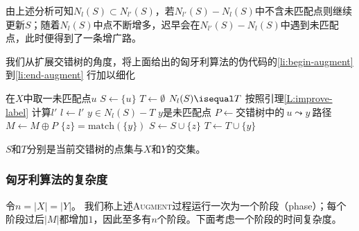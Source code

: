 \documentclass[a4paper]{ctexbook}
\newcommand{\match}{\mathrm{match}}
\begin{document}
  由上述分析可知$N_l(S)\subset N_{l'}(S)$，若$N_{l'}(S)-N_{l}(S)$中不含未匹配点则继续更新$S$；随着$N_l(S)$中点不断增多，迟早会在$N_{l'}(S)-N_{l}(S)$中遇到未匹配点，此时便得到了一条增广路。

  我们从扩展交错树的角度，将上面给出的匈牙利算法的伪代码的\ref{li:begin-augment} 到\ref{li:end-augment} 行加以细化
  \begin{codebox}
    \li 在$X$中取一未匹配点$u$
    \li $S \gets \{u\}$
    \li $T \gets\emptyset$
    \li \Repeat
    \li \If $N_l(S)\isequal T$\Then
    \li   按照引理\ref{L:improve-label} 计算$l'$\label{li:improve-label}
    \li   $l \gets l'$
        \End
    \li   \For $y \in N_l(S)-T$\Do
    \li     \If $y$是未匹配点\Then
    \li       $P \gets \text{交错树中的}\ u\leadsto y\ \text{路径}$
    \li       $M\gets M\oplus P$
    \li       \Return
    \li     \Else
    \li       $\{z\}=\match(\{y\})$
    \li       $S\gets S\cup\{z\}$\label{li:added-to-S}
    \li       $T\gets T\cup\{y\}$
            \End
          \End
  \end{codebox}
  $S$和$T$分别是当前交错树的点集与$X$和$Y$的交集。
  \subsubsection{匈牙利算法的复杂度}
  令$n=|X|=|Y|$。
  我们称上述\textsc{Augment}过程运行一次为一个阶段（phase）；每个阶段过后$|M|$都增加$1$，因此至多有$n$个阶段。下面考虑一个阶段的时间复杂度。
\end{document}
